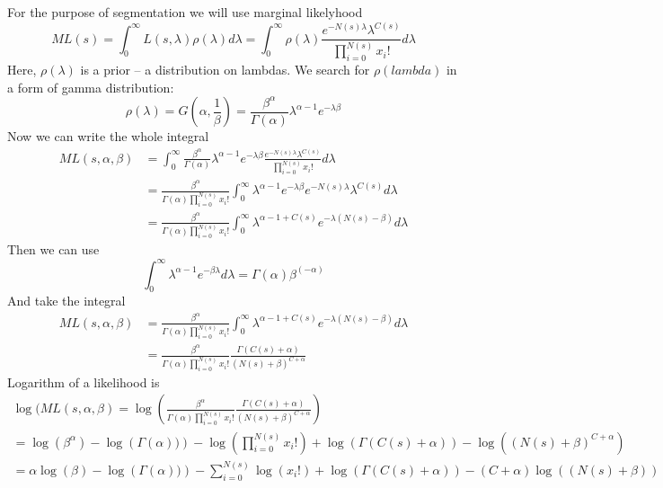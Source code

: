 \documentclass{article}
\begin{document}
For the purpose of segmentation we will use marginal likelyhood
$$
    ML(s) = \int _{0} ^{\infty} L(s, \lambda) \rho(\lambda) d\lambda = 
 \int _{0} ^{\infty} \rho(\lambda) \frac {e^{-N(s)\lambda} \lambda^{C(s)}} {\prod _{i=0} ^{N(s)} x_i!} d\lambda
$$
Here, $\rho(\lambda)$ is a prior -- a distribution on lambdas.
We search for $\rho(lambda)$ in a form of gamma distribution:
$$
 \rho(\lambda) = G(\alpha, \frac 1 \beta) = \frac {\beta^\alpha} {\Gamma(\alpha)} \lambda^{\alpha-1} e^{-\lambda \beta}
$$
Now we can write the whole integral
\begin{align*}
    ML(s, \alpha, \beta) & = 
 \int _{0} ^{\infty} \frac {\beta^\alpha} {\Gamma(\alpha)} \lambda^{\alpha-1} e^{-\lambda \beta} \frac {e^{-N(s)\lambda} \lambda^{C(s)}} {\prod _{i=0} ^{N(s)} x_i!} d\lambda \\
     & = 
  \frac {\beta^\alpha} {\Gamma(\alpha) \prod _{i=0} ^{N(s)} x_i!} \int _{0} ^{\infty} \lambda^{\alpha-1} e^{-\lambda \beta} {e^{-N(s)\lambda} \lambda^{C(s)}} d\lambda\\
     & = 
    \frac {\beta^\alpha} {\Gamma(\alpha) \prod _{i=0} ^{N(s)} x_i!} \int _{0} ^{\infty} \lambda^{\alpha-1+C(s)}  {e^{-\lambda(N(s)-\beta)} } d\lambda
\end{align*}
Then we can use
$$
\int _0 ^{\infty}  \lambda^{\alpha-1} e^{-\beta\lambda}d\lambda = \Gamma(\alpha) \beta^{(-\alpha)}
$$
And take the integral
\begin{align*}
    ML(s, \alpha, \beta) & = 
    \frac {\beta^\alpha} {\Gamma(\alpha) \prod _{i=0} ^{N(s)} x_i!} \int _{0} ^{\infty} \lambda^{\alpha-1+C(s)}  {e^{-\lambda(N(s)-\beta)} } d\lambda \\
    & = 
    \frac {\beta^\alpha} {\Gamma(\alpha) \prod _{i=0} ^{N(s)} x_i!} \frac {\Gamma(C(s)+\alpha)} {(N(s)+\beta)^{C+\alpha}} 
\end{align*}
Logarithm of a likelihood is
\begin{align*}
    \log (ML(s, \alpha, \beta) = 
    \log \left( \frac {\beta^\alpha} {\Gamma(\alpha) \prod _{i=0} ^{N(s)} x_i!} \frac {\Gamma(C(s)+\alpha)} {(N(s)+\beta)^{C+\alpha}} \right)\\
    =
    \log \left( \beta^\alpha \right) - \log \left( \Gamma(\alpha)) \right) -\log \left( \prod _{i=0} ^{N(s)} x_i! \right) + \log \left( \Gamma(C(s)+\alpha)  \right) -
    \log \left( (N(s)+\beta)^{C+\alpha}\right)\\
    =
    \alpha \log \left( \beta \right) - \log \left( \Gamma(\alpha)) \right) -\sum _{i=0} ^{N(s)} \log \left( x_i! \right) + \log \left( \Gamma(C(s)+\alpha)  \right) -
    (C+\alpha)\log \left( (N(s)+\beta)\right)\\
\end{align*}
\end{document}
